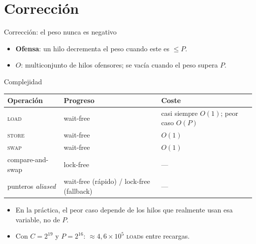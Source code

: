 \documentclass[aspectratio=169,11pt,xcolor=table]{beamer}
\begin{document}
\section{Corrección}
\begin{frame}{Corrección: el peso nunca es negativo}
  \begin{itemize}
    \item<1-> \textbf{Ofensa}: un hilo decrementa el peso cuando este es $\leq P$.
    \item<2-> $O$: multiconjunto de hilos ofensores; se vacía cuando el peso supera $P$.
  \end{itemize}
  \vspace{1mm}
\end{frame}

\begin{frame}{Complejidad}
  \centering
  \begin{tabular}{@{}lll@{}}
    \toprule
    \textbf{Operación} & \textbf{Progreso} & \textbf{Coste} \\
    \midrule
    \textsc{load}   & wait-free & casi siempre $O(1)$; peor caso $O(P)$ \\
    \textsc{store}  & wait-free & $O(1)$ \\
    \textsc{swap}   & wait-free & $O(1)$ \\
    compare-and-swap & lock-free & --- \\
    punteros \emph{aliased} & wait-free (rápido) / lock-free (fallback) & --- \\
    \bottomrule
  \end{tabular}
  \vspace{4mm}
  \begin{itemize}
    \item<2-> En la práctica, el peor caso depende de los hilos que \alert{realmente} usan esa variable, no de $P$.
    \item<3-> Con $C=2^{19}$ y $P=2^{16}$: $\approx 4{,}6\times10^5$ \textsc{load}s entre recargas.
  \end{itemize}
\end{frame}
\end{document}
